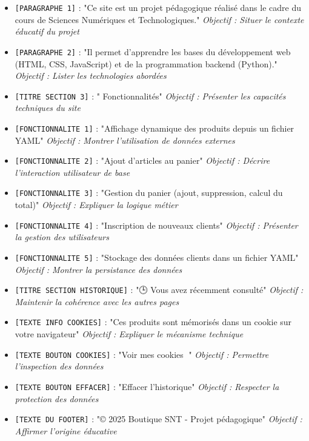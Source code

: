 \documentclass[12pt,a4paper]{article}
\begin{document}
\begin{itemize}
\item \texttt{[PARAGRAPHE 1]} : "Ce site est un projet pédagogique réalisé dans le cadre du cours de Sciences Numériques et Technologiques." \newline \textit{Objectif : Situer le contexte éducatif du projet}
\item \texttt{[PARAGRAPHE 2]} : "Il permet d'apprendre les bases du développement web (HTML, CSS, JavaScript) et de la programmation backend (Python)." \newline \textit{Objectif : Lister les technologies abordées}
\item \texttt{[TITRE SECTION 3]} : "\faBullseye{} Fonctionnalités" \newline \textit{Objectif : Présenter les capacités techniques du site}
\item \texttt{[FONCTIONNALITE 1]} : "Affichage dynamique des produits depuis un fichier YAML" \newline \textit{Objectif : Montrer l'utilisation de données externes}
\item \texttt{[FONCTIONNALITE 2]} : "Ajout d'articles au panier" \newline \textit{Objectif : Décrire l'interaction utilisateur de base}
\item \texttt{[FONCTIONNALITE 3]} : "Gestion du panier (ajout, suppression, calcul du total)" \newline \textit{Objectif : Expliquer la logique métier}
\item \texttt{[FONCTIONNALITE 4]} : "Inscription de nouveaux clients" \newline \textit{Objectif : Présenter la gestion des utilisateurs}
\item \texttt{[FONCTIONNALITE 5]} : "Stockage des données clients dans un fichier YAML" \newline \textit{Objectif : Montrer la persistance des données}
\item \texttt{[TITRE SECTION HISTORIQUE]} : "🕒 Vous avez récemment consulté" \newline \textit{Objectif : Maintenir la cohérence avec les autres pages}
\item \texttt{[TEXTE INFO COOKIES]} : "Ces produits sont mémorisés dans un cookie sur votre navigateur" \newline \textit{Objectif : Expliquer le mécanisme technique}
\item \texttt{[TEXTE BOUTON COOKIES]} : "Voir mes cookies 🍪" \newline \textit{Objectif : Permettre l'inspection des données}
\item \texttt{[TEXTE BOUTON EFFACER]} : "Effacer l'historique" \newline \textit{Objectif : Respecter la protection des données}
\item \texttt{[TEXTE DU FOOTER]} : "© 2025 Boutique SNT - Projet pédagogique" \newline \textit{Objectif : Affirmer l'origine éducative}
\end{itemize}
\end{document}
